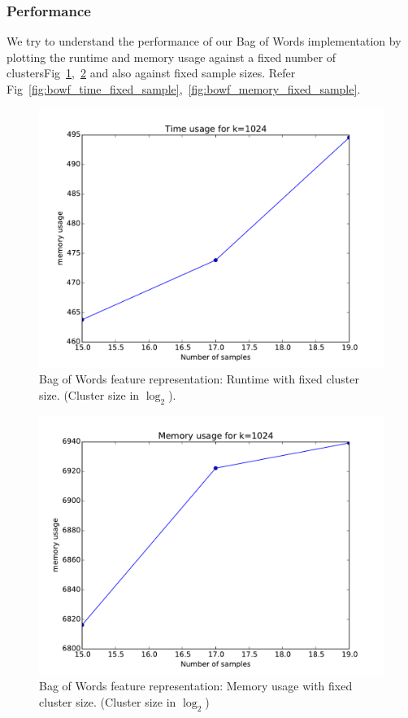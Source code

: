 \documentclass[final,leqno,onefignum,onetabnum]{siamltexmm}
\begin{document}
\subsubsection{Performance}
We try to understand the performance of our Bag of Words implementation by plotting the runtime and memory usage against a fixed number of clustersFig~\ref{fig:bowf_time_fixed_cluster},~\ref{fig:bowf_memory_fixed_cluster} and also against fixed sample sizes. Refer Fig~\ref{fig:bowf_time_fixed_sample},~\ref{fig:bowf_memory_fixed_sample}.
\begin{figure}
  \centering
  \includegraphics[width=0.60\linewidth]{images/bofwTimeFixedCluster}
  \caption{Bag of Words feature representation: Runtime with fixed cluster size. (Cluster size in $\log_{2}$).\label{fig:bowf_time_fixed_cluster}}
\end{figure}
\begin{figure}
  \centering
  \includegraphics[width=0.60\linewidth]{images/bofwMemoryFixedCluster}
  \caption{Bag of Words feature representation: Memory usage with fixed cluster size. (Cluster size in $\log_{2}$)\label{fig:bowf_memory_fixed_cluster}}
\end{figure}
\end{document}
